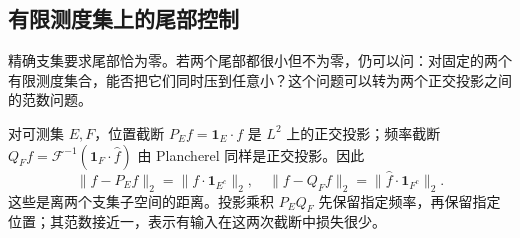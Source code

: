 \subsection{有限测度集上的尾部控制}
\label{b2:subsec:200303}

精确支集要求尾部恰为零。若两个尾部都很小但不为零，仍可以问：对固定的两个有限测度集合，能否把它们同时压到任意小？这个问题可以转为两个正交投影之间的范数问题。

\ProseParagraphBreak

对可测集 \(E,F\)，位置截断 \(P_Ef=\mathbf1_E\cdot f\) 是 \(L^2\) 上的正交投影；频率截断
\(Q_Ff=\mathcal F^{-1}(\mathbf1_F\cdot\widehat f)\)
由 Plancherel 同样是正交投影。因此
\[
 \|f-P_Ef\|_2=\|f\cdot\mathbf1_{E^c}\|_2,
 \quad
 \|f-Q_Ff\|_2=\|\widehat f\cdot\mathbf1_{F^c}\|_2.
\]
这些是离两个支集子空间的距离。投影乘积 \(P_EQ_F\) 先保留指定频率，再保留指定位置；其范数接近一，表示有输入在这两次截断中损失很少。

